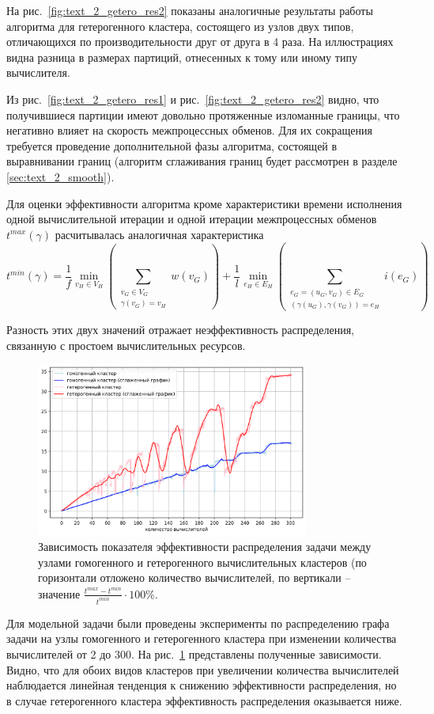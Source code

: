 На рис.~\ref{fig:text_2_getero_res2} показаны аналогичные результаты работы алгоритма для гетерогенного кластера, состоящего из узлов двух типов, отличающихся по производительности друг от друга в 4 раза.
На иллюстрациях видна разница в размерах партиций, отнесенных к тому или иному типу вычислителя.

Из рис.~\ref{fig:text_2_getero_res1} и рис.~\ref{fig:text_2_getero_res2} видно, что получившиеся партиции имеют довольно протяженные изломанные границы, что негативно влияет на скорость межпроцессных обменов.
Для их сокращения требуется проведение дополнительной фазы алгоритма, состоящей в выравнивании границ (алгоритм сглаживания границ будет рассмотрен в разделе \ref{sec:text_2_smooth}).

Для оценки эффективности алгоритма кроме характеристики времени исполнения одной вычислительной итерации и одной итерации межпроцессных обменов $t^{max}(\gamma)$ расчитывалась аналогичная характеристика
\begin{equation}
	t^{min}(\gamma) =
		\frac{1}{f} \min_{v_H \in V_H}{\left( \sum_{\substack{v_G \in V_G \\ \gamma(v_G) = v_H}}{w(v_G)} \right)} + 
		\frac{1}{l} \min_{e_H \in E_H}{\left( \sum_{\substack{e_G = (u_G, v_G) \in E_G \\ (\gamma(u_G), \gamma(v_G)) = e_H}}{i(e_G)} \right)}
\end{equation}

Разность этих двух значений отражает неэффективность распределения, связанную с простоем вычислительных ресурсов.

\begin{figure}[H]
\centering
\includegraphics[width=0.8\textwidth]{./pics/text_2_getero/chart2.png}
\caption{Зависимость показателя эффективности распределения задачи между узлами гомогенного и гетерогенного вычислительных кластеров (по горизонтали отложено количество вычислителей, по вертикали -- значение $\frac{t^{max} - t^{min}}{t^{min}} \cdot 100\%$.}
\label{fig:text_2_getero_chart}
\end{figure}

Для модельной задачи были проведены эксперименты по распределению графа задачи на узлы гомогенного и гетерогенного кластера при изменении количества вычислителей от 2 до 300.
На рис.~\ref{fig:text_2_getero_chart} представлены полученные зависимости.
Видно, что для обоих видов кластеров при увеличении количества вычислителей наблюдается линейная тенденция к снижению эффективности распределения, но в случае гетерогенного кластера эффективность распределения оказывается ниже.

